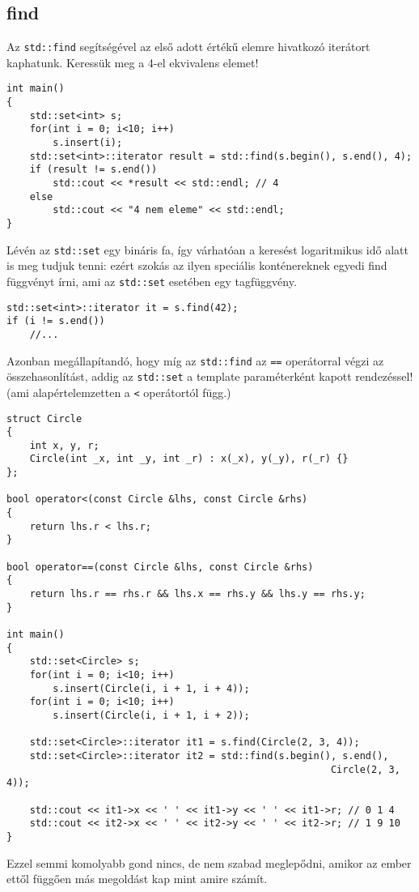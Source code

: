 \documentclass[a4paper,11.5pt,table]{article}
\begin{document}
	\subsection{find}
	Az \texttt{std::find} segítségével az első adott értékű elemre hivatkozó iterátort kaphatunk. Keressük meg a 4-el ekvivalens elemet!
	\begin{lstlisting}
int main()
{
	std::set<int> s;
	for(int i = 0; i<10; i++)
		s.insert(i);
	std::set<int>::iterator result = std::find(s.begin(), s.end(), 4);
	if (result != s.end())
		std::cout << *result << std::endl; // 4
	else
		std::cout << "4 nem eleme" << std::endl;
}
	\end{lstlisting}
	\begin{note}
		Lévén az \texttt{std::set} egy bináris fa, így várhatóan a keresést logaritmikus idő alatt is meg tudjuk tenni: ezért szokás az ilyen speciális konténereknek egyedi find függvényt írni, ami az \texttt{std::set} esetében egy tagfüggvény. 
	\end{note}
	\begin{lstlisting}
std::set<int>::iterator it = s.find(42);
if (i != s.end())
	//...
	\end{lstlisting}
	Azonban megállapítandó, hogy míg az \texttt{std::find} az \texttt{==} operátorral végzi az összehasonlítást, addig az \texttt{std::set} a template paraméterként kapott rendezéssel! (ami alapértelemzetten a \texttt{<} operátortól függ.)
\begin{lstlisting}
struct Circle
{
	int x, y, r;
	Circle(int _x, int _y, int _r) : x(_x), y(_y), r(_r) {}
};

bool operator<(const Circle &lhs, const Circle &rhs)
{
	return lhs.r < lhs.r;
}

bool operator==(const Circle &lhs, const Circle &rhs)
{
	return lhs.r == rhs.r && lhs.x == rhs.y && lhs.y == rhs.y;
}

int main()
{
	std::set<Circle> s;
	for(int i = 0; i<10; i++)
		s.insert(Circle(i, i + 1, i + 4));
	for(int i = 0; i<10; i++)
		s.insert(Circle(i, i + 1, i + 2));
	
	std::set<Circle>::iterator it1 = s.find(Circle(2, 3, 4));
	std::set<Circle>::iterator it2 = std::find(s.begin(), s.end(), 
														Circle(2, 3, 4));
	
	std::cout << it1->x << ' ' << it1->y << ' ' << it1->r; // 0 1 4
	std::cout << it2->x << ' ' << it2->y << ' ' << it2->r; // 1 9 10
}
\end{lstlisting}
	Ezzel semmi komolyabb gond nincs, de nem szabad meglepődni, amikor az ember ettől függően más megoldást kap mint amire számít.
\end{document}
